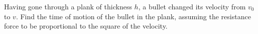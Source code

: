 \item Having gone through a plank of thickness \( h \), a bullet changed its velocity from \( v_0 \) to \( v \). Find the time of motion of the bullet in the plank, assuming the resistance force to be proportional to the square of the velocity.